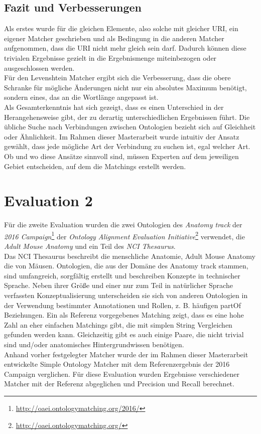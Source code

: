 		\subsection{Fazit und Verbesserungen}
		Als erstes wurde für die gleichen Elemente, also solche mit gleicher URI, ein
		eigener Matcher geschrieben und als Bedingung in die anderen Matcher
		aufgenommen, dass die URI nicht mehr gleich sein darf. Dadurch können diese
		trivialen Ergebnisse gezielt in die Ergebnismenge miteinbezogen oder
		ausgeschlossen werden.\\
		Für den Levenshtein Matcher ergibt sich die Verbesserung, dass die obere
		Schranke für mögliche Änderungen nicht nur ein absolutes Maximum benötigt,
		sondern eines, das an die Wortlänge angepasst ist.\\
		Als Gesamterkenntnis hat sich gezeigt, dass es einen Unterschied in der
		Herangehensweise gibt, der zu derartig unterschiedlichen Ergebnissen führt.
		Die übliche Suche nach Verbindungen zwischen Ontologien bezieht sich auf
		Gleichheit oder Ähnlichkeit. Im Rahmen dieser Masterarbeit wurde intuitiv der
		Ansatz gewählt, dass jede mögliche Art der Verbindung zu suchen ist, egal
		welcher Art. Ob und wo diese Ansätze sinnvoll sind, müssen Experten auf dem
		jeweiligen Gebiet entscheiden, auf dem die Matchings erstellt werden.
		
		\section{Evaluation 2}
		\label{subsec:Evaluation 2}
		Für die zweite Evaluation wurden die zwei Ontologien des \textit{Anatomy track} der
		\textit{2016 Campaign}\footnote{\url{http://oaei.ontologymatching.org/2016/}} der
		\textit{Ontology Alignment Evaluation
		Initiative}\footnote{\url{http://oaei.ontologymatching.org/}} verwendet,
		die \textit{Adult Mouse Anatomy} und ein Teil des \textit{NCI Thesaurus}.\\
		Das NCI Thesaurus beschreibt die menschliche Anatomie, Adult Mouse Anatomy die von
		Mäusen. Ontologien, die aus der Domäne des Anatomy track stammen, sind
		umfangreich, sorgfältig erstellt und beschreiben Konzepte in technischer
		Sprache. Neben ihrer Größe und einer nur zum Teil in natürlicher Sprache
		verfassten Konzeptualisierung unterscheiden sie sich von anderen Ontologien in
		der Verwendung bestimmter Annotationen und Rollen, z. B. häufigen partOf
		Beziehungen. Ein als Referenz vorgegebenes Matching zeigt, dass es eine hohe
		Zahl an eher einfachen Matchings gibt, die mit simplen String Vergleichen gefunden werden
		kann. Gleichzeitig gibt es auch einige Paare, die nicht trivial sind und/oder
		anatomisches Hintergrundwissen benötigen.\cite{OAEI16}\\
		Anhand vorher festgelegter Matcher wurde der im Rahmen dieser Masterarbeit
		entwickelte Simple Ontology Matcher mit dem Referenzergebnis der 2016 Campaign
		verglichen. Für diese Evaluation wurden Ergebnisse verschiedener Matcher mit
		der Referenz abgeglichen und Precision und Recall berechnet.\\
		
